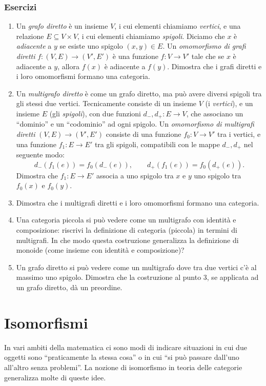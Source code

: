\subsubsection*{Esercizi}
\begin{enumerate}
    \item Un \emph{grafo diretto} è un insieme $V$, i cui elementi chiamiamo \emph{vertici}, e una relazione $E\subseteq V\times V$, i cui elementi chiamiamo \emph{spigoli}. Diciamo che $x$ è \emph{adiacente} a $y$ se esiste uno spigolo $(x,y)\in E$. Un \emph{omomorfismo di grafi diretti} $f:(V,E)\to (V',E')$ è una funzione $f:V\to V'$ tale che se $x$ è adiacente a $y$, allora $f(x)$ è adiacente a $f(y)$. Dimostra che i grafi diretti e i loro omomorfismi formano una categoria. 
    \item Un \emph{multigrafo diretto} è come un grafo diretto, ma può avere diversi spigoli tra gli stessi due vertici. Tecnicamente consiste di un insieme $V$ (i \emph{vertici}), e un insieme $E$ (gli \emph{spigoli}), con due funzioni $d_-,d_+:E\to V$, che associano un ``dominio'' e un ``codominio'' ad ogni spigolo. Un \emph{omomorfismo di multigrafi diretti} $(V,E)\to (V',E')$ consiste di una funzione $f_0:V\to V'$ tra i vertici, e una funzione $f_1:E\to E'$ tra gli spigoli, compatibili con le mappe $d_-,d_+$ nel seguente modo:
    \[
    d_-(f_1(e)) = f_0(d_-(e)) ,\qquad d_+(f_1(e)) = f_0(d_+(e)) .
    \]
    Dimostra che $f_1:E\to E'$ associa a uno spigolo tra $x$ e $y$ uno spigolo tra $f_0(x)$ e $f_0(y)$. 
    \item Dimostra che i multigrafi diretti e i loro omomorfismi formano una categoria. 
    \item Una categoria piccola si può vedere come un multigrafo con identità e composizione: riscrivi la definizione di categoria (piccola) in termini di multigrafi.  In che modo questa costruzione generalizza la definizione di monoide (come insieme con identità e composizione)?
    \item Un grafo diretto si può vedere come un multigrafo dove tra due vertici c'è al massimo uno spigolo. Dimostra che la costruzione al punto 3, se applicata ad un grafo diretto, dà un preordine. 
\end{enumerate}


\section{Isomorfismi}\label{isomorfismi}

In vari ambiti della matematica ci sono modi di indicare situazioni in cui due oggetti sono ``praticamente la stessa cosa'' o in cui ``si può passare dall'uno all'altro senza problemi''. La nozione di isomorfismo in teoria delle categorie generalizza molte di queste idee.

